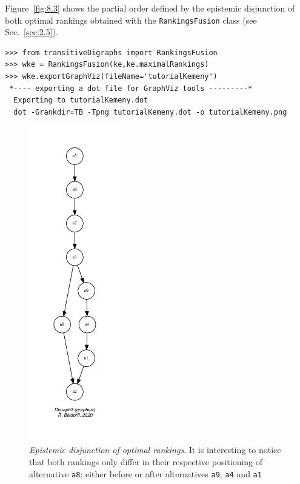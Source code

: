 Figure~\vref{fig:8.3} shows the partial order defined by the epistemic disjunction of both optimal \Kemeny rankings obtained with the \texttt{RankingsFu\-sion} class (see Sec.~\ref{sec:2.5}).
\begin{lstlisting}[caption={Computing the epistemic disjunction of all optimal \Kemeny rankings},label=list:8.10]   
>>> from transitiveDigraphs import RankingsFusion
>>> wke = RankingsFusion(ke,ke.maximalRankings)
>>> wke.exportGraphViz(fileName='tutorialKemeny')
 *---- exporting a dot file for GraphViz tools ---------*
  Exporting to tutorialKemeny.dot
  dot -Grankdir=TB -Tpng tutorialKemeny.dot -o tutorialKemeny.png
\end{lstlisting}
\begin{figure}[ht]
\sidecaption[t]
\includegraphics[width=4cm]{Figures/8-3-tutorialKemeny.pdf}
\caption[Epistemic disjunction of optimal \Kemeny rankings]{\emph{Epistemic disjunction of optimal \Kemeny rankings}. It is interesting to notice that both \Kemeny rankings only differ in their respective positioning of alternative \texttt{a8}; either before or after alternatives \texttt{a9}, \texttt{a4} and \texttt{a1}}
\label{fig:8.3}       %
\end{figure}

